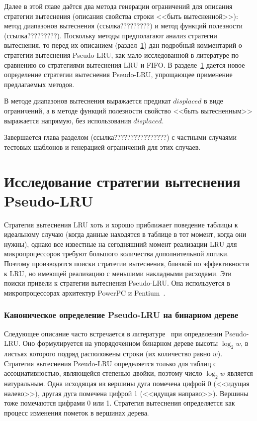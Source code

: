 \documentclass[14pt]{extreport}
\newcommand{\LRU}{\textsf{LRU}\xspace}
\newcommand{\FIFO}{\textsf{FIFO}\xspace}
\newcommand{\PseudoLRU}{\textsf{Pseudo-LRU}\xspace}
\begin{document}
Далее в этой главе даётся два метода генерации ограничений для описания
стратегии вытеснения (описания свойства строки <<быть вытесненной>>): метод
диапазонов вытеснения (ссылка?????????) и метод функций полезности
(ссылка?????????). Поскольку методы предполагают анализ стратегии вытеснения, то
перед их описанием (раздел~\ref{sec:plru_new_definition}) дан подробный
комментарий о стратегии вытеснения \PseudoLRU, как мало исследованной в
литературе по сравнению со стратегиями вытеснения \LRU и \FIFO. В
разделе~\ref{sec:plru_new_definition} дается новое определение стратегии
вытеснения \PseudoLRU, упрощающее применение предлагаемых методов.

В методе диапазонов вытеснения выражается предикат $displaced$ в виде
ограничений, а в методе функций полезности свойство <<быть вытесненным>>
выражается напрямую, без использования $displaced$.

Завершается глава разделом (ссылка????????????????) с частными случаями тестовых
шаблонов и генерацией ограничений для этих случаев.

\section{Исследование стратегии вытеснения
\PseudoLRU}\label{sec:plru_new_definition}

Стратегия вытеснения \LRU хоть и хорошо приближает поведение
таблицы к идеальному случаю (когда данные находятся в
таблице в тот момент, когда они нужны), однако все известные на
сегодняшний момент реализации \LRU для микропроцессоров требуют большого
количества дополнительной логики. Поэтому производятся поиски
стратегии вытеснения, близкой по эффективности к \LRU, но имеющей
реализацию с меньшими накладными расходами. Эти поиски привели к
стратегии вытеснения \PseudoLRU. Она используется в микропроцессорах архитектур
PowerPC и Pentium~\cite{FundamentalOfComputerOrganizationAndDesign}.

\subsubsection{Каноническое определение \PseudoLRU на бинарном дереве}

Следующее описание часто встречается в
литературе~\cite{FundamentalOfComputerOrganizationAndDesign} при
определении \PseudoLRU. Оно формулируется на
упорядоченном бинарном дереве высоты $\log_2 w$, в листьях которого
подряд расположены строки (их количество равно $w$). Стратегия вытеснения
\PseudoLRU
определяется только для таблиц с ассоциативностью, являющейся степенью двойки,
поэтому число $\log_2 w$ является натуральным. Одна исходящая из вершины дуга
помечена цифрой 0 (<<идущая налево>>), другая дуга помечена цифрой 1 (<<идущая
направо>>). Вершины тоже помечаются цифрами 0 или 1. Стратегия вытеснения
определяется как процесс изменения пометок в вершинах дерева.
\end{document}
